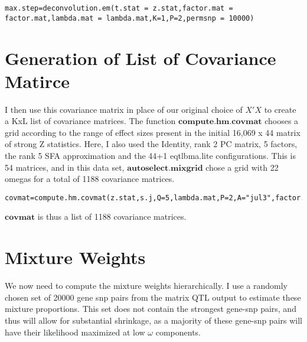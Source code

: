 \documentclass[10pt]{article}
\begin{document}
\begin{itemize}
\begin{verbatim}
max.step=deconvolution.em(t.stat = z.stat,factor.mat = factor.mat,lambda.mat = lambda.mat,K=1,P=2,permsnp = 10000)
\end{verbatim}
%  
%  
%  
%


\section{Generation of List of Covariance Matirce}
I then use this covariance matrix in place of our original choice of $X'X$ to create a KxL list of covariance matrices. The function $\textbf{compute.hm.covmat}$ chooses a grid according to the range of effect sizes present in the initial 16,069 x 44 matrix of strong Z statistics. 
Here, I also used the Identity, rank 2 PC matrix, 5 factors, the rank 5 SFA approximation and the 44+1 eqtlbma.lite configurations. This is 54 matrices, and in this data set, $\textbf{autoselect.mixgrid}$ chose a grid with 22 omegas for a total of 1188 covariance matrices.

\begin{verbatim}
covmat=compute.hm.covmat(z.stat,s.j,Q=5,lambda.mat,P=2,A="jul3",factor.mat,max.step=max.step)

\end{verbatim}

$\textbf{covmat}$ is thus a list of 1188 covariance matrices.


\section{Mixture Weights}
We now need to compute the mixture weights hierarchically. I use  a randomly chosen set of 20000 gene snp pairs from the matrix QTL output to estimate these mixture proportions. This set does not contain the strongest gene-snp pairs, and thus will allow for substantial shrinkage, as a majority of these gene-snp pairs will  have their likelihood maximized at low $\omega$ components.


\end{itemize}
\end{document}
